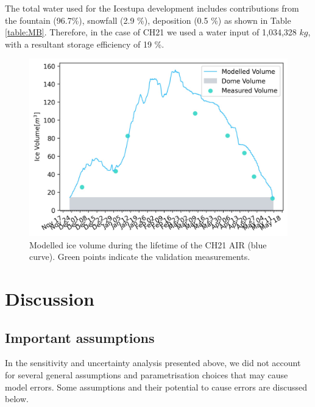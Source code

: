 \documentclass[utf8]{frontiersSCNS} %
\begin{document}
The total water used for the Icestupa development includes contributions from the fountain (96.7\%), snowfall (2.9 \%),
deposition (0.5 \%) as shown in Table \ref{table:MB}. Therefore, in the case of CH21 we used a water input of 1,034,328
$kg$, with a resultant storage efficiency of 19 \%.

  \begin{figure} \begin{center} \includegraphics[width=15 cm]{Figures/Vol_Validation_Manual.jpg} \end{center}
  \caption{Modelled ice volume during the lifetime of the CH21 AIR (blue curve). Green points indicate the validation
  measurements.} \label{fig:results} \end{figure}

 
\section{Discussion}
\subsection{Important assumptions}\label{section:assumptions} In the sensitivity and uncertainty analysis presented
above, we did not account for several general assumptions and parametrisation choices that may cause model errors.
Some assumptions and their potential to cause errors are discussed below.
\end{document}
